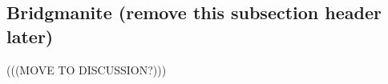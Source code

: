 \documentclass[%
preprint,                                  %
nofootinbib,
 amsmath,amssymb,
 aps,
]{revtex4-1}
\begin{document}
\subsection{\label{sec:intro.brdg}Bridgmanite (remove this subsection header later)}


(((MOVE TO DISCUSSION?)))









\end{document}
